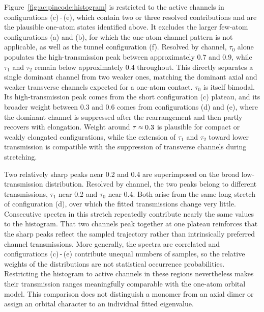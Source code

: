         Figure~\ref{fig:ac:pincode:histogram} is restricted to the active channels in configurations (c)\,-\,(e), which contain two or three resolved contributions and are the plausible one-atom states identified above. It excludes the larger few-atom configurations (a) and (b), for which the one-atom channel pattern is not applicable, as well as the tunnel configuration (f). Resolved by channel, $\tau_0$ alone populates the high-transmission peak between approximately 0.7 and 0.9, while $\tau_1$ and $\tau_2$ remain below approximately 0.4 throughout. This directly separates a single dominant channel from two weaker ones, matching the dominant axial and weaker transverse channels expected for a one-atom contact. $\tau_0$ is itself bimodal. Its high-transmission peak comes from the short configuration (c) plateau, and its broader weight between 0.3 and 0.6 comes from configurations (d) and (e), where the dominant channel is suppressed after the rearrangement and then partly recovers with elongation. Weight around $\tau\sapprox0.3$ is plausible for compact or weakly elongated configurations, while the extension of $\tau_1$ and $\tau_2$ toward lower transmission is compatible with the suppression of transverse channels during stretching.

        Two relatively sharp peaks near 0.2 and 0.4 are superimposed on the broad low-transmission distribution. Resolved by channel, the two peaks belong to different transmissions, $\tau_1$ near 0.2 and $\tau_0$ near 0.4. Both arise from the same long stretch of configuration (d), over which the fitted transmissions change very little. Consecutive spectra in this stretch repeatedly contribute nearly the same values to the histogram. That two channels peak together at one plateau reinforces that the sharp peaks reflect the sampled trajectory rather than intrinsically preferred channel transmissions. More generally, the spectra are correlated and configurations (c)\,-\,(e) contribute unequal numbers of samples, so the relative weights of the distributions are not statistical occurrence probabilities. Restricting the histogram to active channels in these regions nevertheless makes their transmission ranges meaningfully comparable with the one-atom orbital model. This comparison does not distinguish a monomer from an axial dimer or assign an orbital character to an individual fitted eigenvalue.

